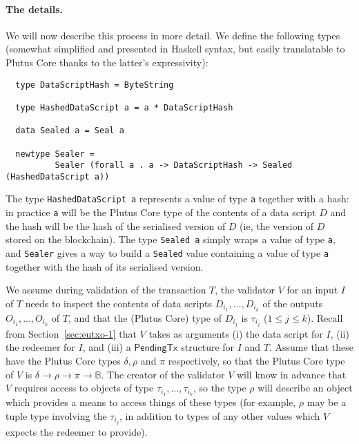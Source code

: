 \documentclass[a4paper]{article}
\newcommand{\s}{\textsf}  %
\newcommand{\ptx}{\ensuremath{\s{PendingTx}}}
\newcommand\B{\ensuremath{\mathbb{B}}}
\begin{document}
\paragraph{The details.} We will now describe this process in more
detail.  We define the following types (somewhat simplified and
presented in Haskell syntax, but easily translatable to Plutus Core
thanks to the latter's expressivity):

\begin{verbatim}
  type DataScriptHash = ByteString

  type HashedDataScript a = a * DataScriptHash

  data Sealed a = Seal a

  newtype Sealer = 
          Sealer (forall a . a -> DataScriptHash -> Sealed (HashedDataScript a))
\end{verbatim}

\noindent The type \verb|HashedDataScript a| represents a value of
type \verb|a| together with a hash: in practice \verb|a| will be the
Plutus Core type of the contents of a data script $D$ and the hash
will be the hash of the serialised version of $D$ (ie, the version of
$D$ stored on the blockchain).  The type \verb|Sealed a| simply wraps
a value of type \verb|a|, and \verb|Sealer| gives a way to build a
\verb|Sealed| value containing a value of type \verb|a| together with
the hash of its serialised version.

We assume during validation of the transaction $T$, the validator $V$
for an input $I$ of $T$ needs to inspect the contents of data scripts
$D_{i_1}, \ldots, D_{i_k}$ of the outputs $O_{i_1}, \ldots, O_{i_k}$
of $T$, and that the (Plutus Core) type of $D_{i_j}$ is $\tau_{i_j}$
($1\le j \le k$).  Recall from Section~\ref{sec:eutxo-1} that $V$
takes as arguments (i) the data script for $I$, (ii) the redeemer for
$I$, and (iii) a $\ptx$ structure for $I$ and $T$.  Assume that these
have the Plutus Core types $\delta, \rho$ and $\pi$ respectively, so
that the Plutus Core type of $V$ is
$\delta \rightarrow \rho \rightarrow \pi \rightarrow \B$.  The creator
of the validator $V$ will know in advance that $V$ requires access to
objects of type $\tau_{i_1}, \ldots, \tau_{i_k}$, so the type $\rho$
will describe an object which provides a means to access things of
these types (for example, $\rho$ may be a tuple type involving the
$\tau_{i_j}$, in addition to types of any other values which $V$
expects the redeemer to provide).

\newcommand{\sealed}{\mathsf{Sealed}}
\newcommand{\sealer}{\mathsf{Sealer}}
\end{document}
